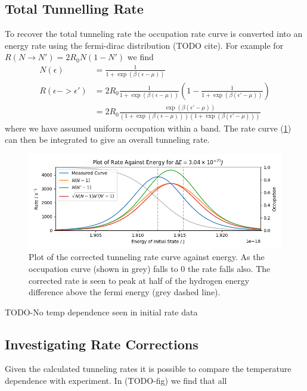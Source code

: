 \subsection{Total Tunnelling Rate}
To recover the total tunneling
rate the occupation rate curve
is converted into an
energy rate using the
fermi-dirac distribution (TODO cite).
For example for \(R(N\rightarrow{}N') = 2R_0N(1-N')\)
we find
\begin{align}
    N(\epsilon)             & = \frac{1}{1 + \exp{(\beta(\epsilon - \mu))}}                                                                         \\
    R(\epsilon-> \epsilon') & = 2R_0 \frac{1}{1 + \exp{(\beta(\epsilon - \mu))}}(1- \frac{1}{1 + \exp{(\beta(\epsilon' - \mu))}})                   \\
                            & = 2R_0 \frac{\exp{(\beta(\epsilon' - \mu))}}{(1 + \exp{(\beta(\epsilon - \mu))})(1 + \exp{(\beta(\epsilon' - \mu))})}
\end{align}
where we have assumed uniform
occupation within a band.
The rate curve
(\cref{fig:tunneling rate against energy})
can then be
integrated to give an
overall tunneling rate.
\begin{figure}[htbp]
    \centering
    \includegraphics[width =0.9 \linewidth]{Figures/Simulation/Corrected Decay Rates.png}
    \caption{Plot of the corrected
        tunneling rate curve against
        energy. As the occupation curve
        (shown in grey) falls to 0
        the rate falls also. The corrected
        rate is seen to peak at half of the hydrogen
        energy difference above the fermi
        energy (grey dashed line).
    }\label{fig:tunneling rate against energy}
\end{figure}

TODO-No temp dependence seen in
initial rate data
\subsection{Investigating Rate Corrections}
Given the calculated tunneling rates
it is possible to compare
the temperature dependence
with experiment. In (TODO-fig)
we find that all


